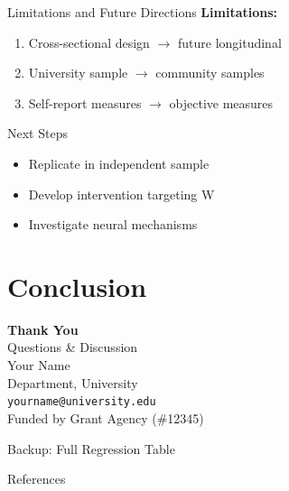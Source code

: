 \documentclass[aspectratio=169,11pt]{beamer}
\begin{document}
\begin{frame}{Limitations and Future Directions}
  \textbf{Limitations:}
  \begin{enumerate}
    \item Cross-sectional design $\to$ future longitudinal
    \item University sample $\to$ community samples
    \item Self-report measures $\to$ objective measures
  \end{enumerate}
  \vspace{0.5cm}
  \begin{block}{Next Steps}
    \begin{itemize}
      \item Replicate in independent sample
      \item Develop intervention targeting W
      \item Investigate neural mechanisms
    \end{itemize}
  \end{block}
\end{frame}

\section{Conclusion}

\begin{frame}[plain]
  \begin{center}
    {\LARGE \textbf{Thank You}}\\[1cm]
    {\Large Questions \& Discussion}\\[1.5cm]
    Your Name\\
    Department, University\\
    \texttt{yourname@university.edu}\\[1cm]
    {\footnotesize Funded by Grant Agency (\#12345)}
  \end{center}
\end{frame}

\appendix

\begin{frame}{Backup: Full Regression Table}
\end{frame}

\begin{frame}[allowframebreaks]{References}
  \printbibliography
\end{frame}
\end{document}
